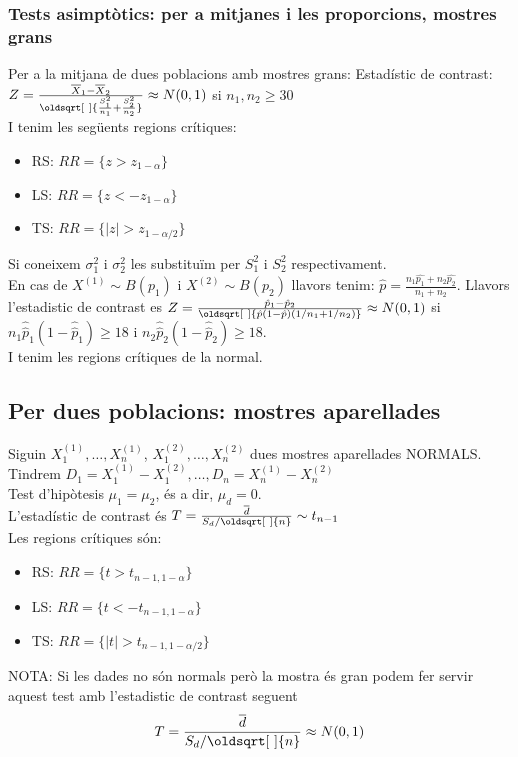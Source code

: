 \documentclass[a4paper]{sciposter}
\renewcommand*{\sqrt}[2][\ ]{\oldsqrt[#1]{#2} }
\begin{document}
\begin{multicols}{3}
\subsubsection{Tests asimptòtics: per a mitjanes i les proporcions, mostres grans}
Per a la mitjana de dues poblacions amb mostres grans:
Estadístic de contrast: $Z = \frac{\overline{X}_1 - \overline{X}_2}{\sqrt{\frac{S_1^2}{n_1} + \frac{S_2^2}{n_2}}} \approx N(0,1)$ si $n_1, n_2 \geq 30$\\
I tenim les següents regions crítiques:
\begin{itemize}
	\item RS: $RR = \{z > z_{1-\alpha}\}$
	\item LS: $RR = \{z < -z_{1-\alpha}\}$
	\item TS: $RR = \{|z| > z_{1-\alpha/2}\}$
\end{itemize}
Si coneixem $\sigma_1^2$ i $\sigma_2^2$ les substituïm per $S_1^2$ i $S_2^2$ respectivament.\\
En cas de $X^{(1)} \sim B(p_1)$ i $X^{(2)} \sim B(p_2)$ llavors tenim:
$\hat{p} = \frac{n_1\hat{p_1}+n_2\hat{p_2}}{n_1+n_2}$. Llavors l'estadistic de contrast es $Z = \frac{\hat{p}_1 - \hat{p}_2}{\sqrt{\hat{p}(1-\hat{p})(1/n_1 + 1/n_2)}} \approx N(0,1)$ si $n_1\hat{\hat{p}}_1(1-\hat{\hat{p}}_1) \geq 18$ i $n_2\hat{\hat{p}}_2(1-\hat{\hat{p}}_2) \geq 18$.\\
I tenim les regions crítiques de la normal.
\subsection{Per dues poblacions: mostres aparellades}
Siguin $X_1^{(1)},\dots,X_n^{(1)}$, $X_1^{(2)},\dots,X_n^{(2)}$ dues mostres aparellades NORMALS. Tindrem $D_1 = X_1^{(1)} - X_1^{(2)},\dots,D_n = X_n^{(1)} - X_n^{(2)}$\\
Test d'hipòtesis $\mu_1 = \mu_2$, és a dir, $\mu_d = 0$.\\
L'estadístic de contrast és $T = \frac{\overline{d}}{S_d/\sqrt{n}} \sim t_{n-1}$\\
Les regions crítiques són:
\begin{itemize}
	\item RS: $RR = \{t > t_{n-1,1-\alpha}\}$
	\item LS: $RR = \{t < -t_{n-1,1-\alpha}\}$
	\item TS: $RR = \{|t| > t_{n-1,1-\alpha/2}\}$
\end{itemize}
NOTA: Si les dades no són normals però la mostra és gran podem fer servir aquest test amb l'estadistic de contrast seguent
\begin{displaymath}
	T = \frac{\overline{d}}{S_d/\sqrt{n}} \approx N(0,1)
\end{displaymath}

\end{multicols}
\end{document}
